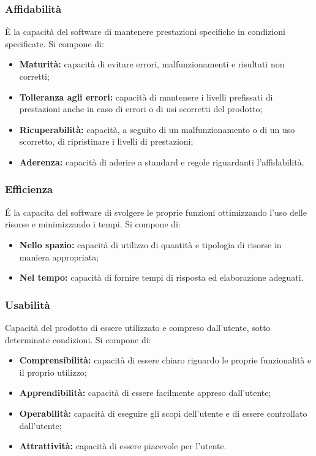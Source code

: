 \subsubsection{Affidabilità}
È la capacità del software di mantenere prestazioni specifiche in condizioni specificate.
Si compone di:
\begin{itemize}
    \item \textbf{Maturità: }capacità di evitare errori, malfunzionamenti e risultati non corretti;
    \item \textbf{Tolleranza agli errori: }capacità di mantenere i livelli prefissati di prestazioni anche in caso di errori o di usi scorretti del prodotto;
    \item \textbf{Ricuperabilità: }capacità, a seguito di un malfunzionamento o di un uso scorretto, di ripristinare i livelli di prestazioni;
    \item \textbf{Aderenza: }capacità di aderire a standard e regole riguardanti l'affidabilità.
\end{itemize}
\subsubsection{Efficienza}
\'E la capacita del software di svolgere le proprie funzioni ottimizzando l'uso delle risorse e minimizzando i tempi. Si compone di:
\begin{itemize}
    \item  \textbf{Nello spazio: }capacità di utilizzo di quantità e tipologia di risorse in maniera appropriata;
    \item  \textbf{Nel tempo: }capacità di fornire tempi di risposta ed elaborazione adeguati.
\end{itemize}
\subsubsection{Usabilità}
Capacità del prodotto di essere utilizzato e compreso dall'utente, sotto determinate condizioni. Si compone di:
\begin{itemize}
    \item \textbf{Comprensibilità: }capacità di essere chiaro riguardo le proprie funzionalità e il proprio utilizzo;
    \item \textbf{Apprendibilità: }capacità di essere facilmente appreso dall'utente;
    \item \textbf{Operabilità: }capacità di eseguire gli scopi dell'utente e di essere controllato dall'utente;
    \item \textbf{Attrattività: }capacità di essere piacevole per l'utente.
\end{itemize}
